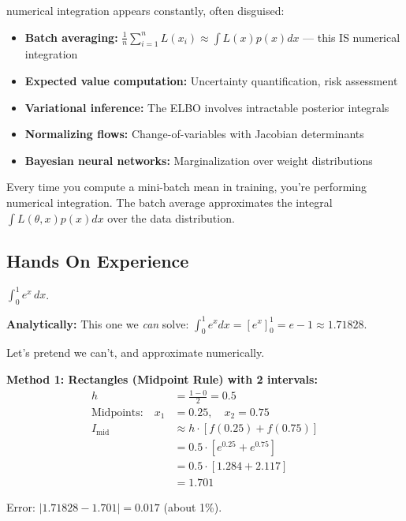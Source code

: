  numerical integration appears constantly, often disguised:
\begin{itemize}
    \item \textbf{Batch averaging:} $\frac{1}{n}\sum_{i=1}^n L(x_i) \approx \int L(x) p(x) dx$ --- this IS numerical integration
    \item \textbf{Expected value computation:} Uncertainty quantification, risk assessment
    \item \textbf{Variational inference:} The ELBO involves intractable posterior integrals
    \item \textbf{Normalizing flows:} Change-of-variables with Jacobian determinants
    \item \textbf{Bayesian neural networks:} Marginalization over weight distributions
\end{itemize}

 Every time you compute a mini-batch mean in training, you're performing numerical integration. The batch average approximates the integral $\int L(\theta, x) p(x) dx$ over the data distribution.



\newpage
\subsection{Hands On Experience}

 $\int_0^1 e^x \, dx$.

\textbf{Analytically:} This one we \emph{can} solve: $\int_0^1 e^x dx = [e^x]_0^1 = e - 1 \approx 1.71828$.

Let's pretend we can't, and approximate numerically.

\vspace{1em}
\textbf{Method 1: Rectangles (Midpoint Rule) with 2 intervals:}
\begin{align*}
    h &= \frac{1-0}{2} = 0.5 \\
    \text{Midpoints:} \quad x_1 &= 0.25, \quad x_2 = 0.75 \\
    I_{\text{mid}} &\approx h \cdot [f(0.25) + f(0.75)] \\
    &= 0.5 \cdot [e^{0.25} + e^{0.75}] \\
    &= 0.5 \cdot [1.284 + 2.117] \\
    &= 1.701
\end{align*}

Error: $|1.71828 - 1.701| = 0.017$ (about 1\%).

